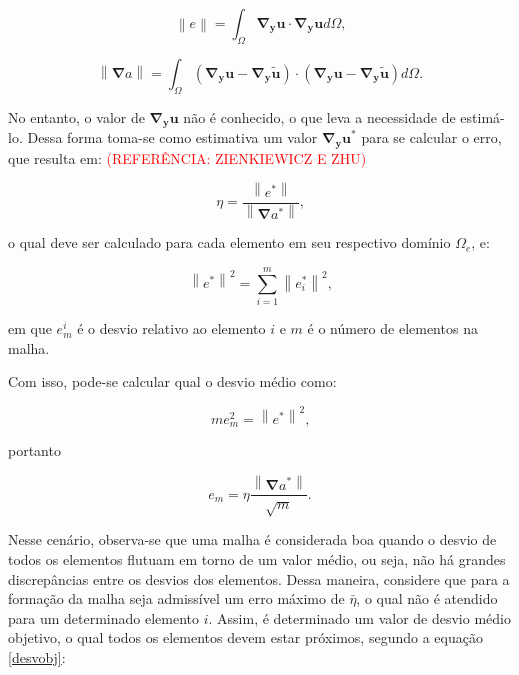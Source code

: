 \documentclass[_ArquivoPrincipal.tex]{subfiles}
\begin{document}
\begin{equation}
    \left\lVert e\right\lVert=\int_{\Omega}{\mathbf{\nabla_y u}\cdot\mathbf{\nabla_y u}d\Omega}\text{,}
    \label{norme}
\end{equation}

\begin{equation}
    \left\lVert\mathbf{\nabla}a\right\lVert=\int_{\Omega}{(\mathbf{\nabla_y u}-\mathbf{\nabla_y\tilde{u}})\cdot(\mathbf{\nabla_y u}-\mathbf{\nabla_y\tilde{u}})d\Omega}\text{.}
    \label{normu}
\end{equation}

No entanto, o valor de $\mathbf{\nabla_y u}$ não é conhecido, o que leva a necessidade de estimá-lo. Dessa forma toma-se como estimativa um valor $\mathbf{\nabla_y u}^*$ para se calcular o erro, que resulta em: \textcolor{red}{(REFERÊNCIA: ZIENKIEWICZ E ZHU)}

\begin{equation}
    \eta=\frac{\left\lVert e^*\right\lVert}{\left\lVert\mathbf{\nabla}a^*\right\lVert}\text{,}
    \label{errorelest}
\end{equation}

\noindent o qual deve ser calculado para cada elemento em seu respectivo domínio $\Omega_e$, e:

\begin{equation}
    \left\lVert e^*\right\lVert^2=\sum_{i=1}^{m}{\left\lVert e_i^*\right\lVert^2}\text{,}
    \label{norme-2}
\end{equation}

\noindent em que $e^i_m$ é o desvio relativo ao elemento $i$ e $m$ é o número de elementos na malha.

Com isso, pode-se calcular qual o desvio médio como:

\begin{equation}
    me^2_m=\left\lVert e^*\right\lVert^2\text{,}
    \label{emed}
\end{equation}

\noindent portanto

\begin{equation}
    e_m=\eta\frac{\left\lVert\mathbf{\nabla}a^*\right\lVert}{\sqrt{m}}\text{.}
    \label{emed-2}
\end{equation}

Nesse cenário, observa-se que uma malha é considerada boa quando o desvio de todos os elementos flutuam em torno de um valor médio, ou seja, não há grandes discrepâncias entre os desvios dos elementos. Dessa maneira, considere que para a formação da malha seja admissível um erro máximo de $\bar{\eta}$, o qual não é atendido para um determinado elemento $i$. Assim, é determinado um valor de desvio médio objetivo, o qual todos os elementos devem estar próximos, segundo a equação \ref{desvobj}:
\end{document}
